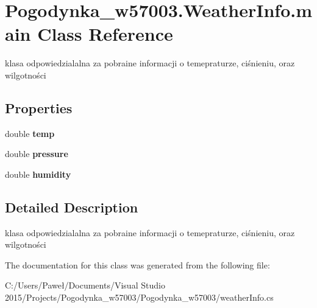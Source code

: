 \hypertarget{class_pogodynka__w57003_1_1_weather_info_1_1main}{}\section{Pogodynka\+\_\+w57003.\+Weather\+Info.\+main Class Reference}
\label{class_pogodynka__w57003_1_1_weather_info_1_1main}


klasa odpowiedzialalna za pobraine informacji o temepraturze, ciśnieniu, oraz wilgotności  


\subsection*{Properties}
\begin{DoxyCompactItemize}
\item 
\mbox{\label{class_pogodynka__w57003_1_1_weather_info_1_1main_a5120c22c35a0da4b5eb20aa939885211}} 
double {\bfseries temp}
\item 
\mbox{\label{class_pogodynka__w57003_1_1_weather_info_1_1main_acdf846f787b99c43f66eaaa2a0ce01ce}} 
double {\bfseries pressure}
\item 
\mbox{\label{class_pogodynka__w57003_1_1_weather_info_1_1main_a73edaa1d4e96d6d43e82ab379eceaac5}} 
double {\bfseries humidity}
\end{DoxyCompactItemize}


\subsection{Detailed Description}
klasa odpowiedzialalna za pobraine informacji o temepraturze, ciśnieniu, oraz wilgotności 



The documentation for this class was generated from the following file\+:\begin{DoxyCompactItemize}
\item 
C\+:/\+Users/\+Paweł/\+Documents/\+Visual Studio 2015/\+Projects/\+Pogodynka\+\_\+w57003/\+Pogodynka\+\_\+w57003/weather\+Info.\+cs\end{DoxyCompactItemize}
